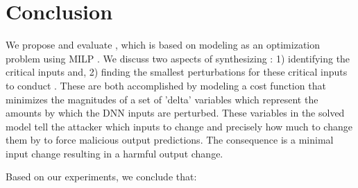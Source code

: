 \chapter{Conclusion}
\label{conclusion}
We propose and evaluate \tool, which is based on modeling \attack as an optimization problem using MILP .
We discuss two aspects of synthesizing \attack: 1) identifying the critical inputs and, 2) finding the smallest perturbations for these critical inputs to conduct \attack.
These are both accomplished by modeling a cost function that minimizes the magnitudes of a set of 'delta' variables which represent the amounts by which the DNN inputs are perturbed.
These variables in the solved model tell the attacker which inputs to change and precisely how much to change them by to force malicious output predictions. The consequence is a minimal input change resulting
in a harmful output change.%


Based on our experiments, we conclude that:

